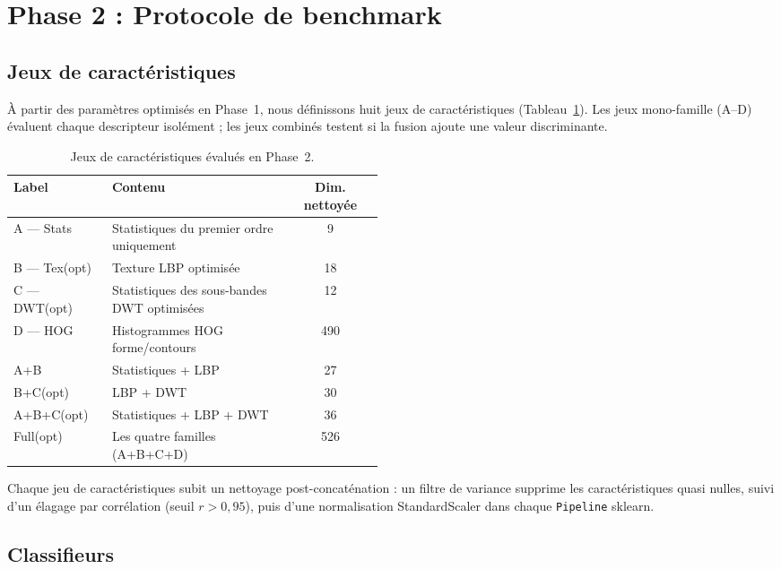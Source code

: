 \section{Phase 2 : Protocole de benchmark}
\label{sec:phase2}

\subsection{Jeux de caractéristiques}

À partir des paramètres optimisés en Phase~1, nous définissons huit jeux de
caractéristiques (Tableau~\ref{tab:feature_sets}). Les jeux mono-famille (A--D)
évaluent chaque descripteur isolément ; les jeux combinés testent si la fusion
ajoute une valeur discriminante.

\begin{table}[H]
  \centering
  \caption{Jeux de caractéristiques évalués en Phase~2.}
  \label{tab:feature_sets}
  \begin{tabular}{@{}lp{0.48\linewidth}c@{}}
    \toprule
    \textbf{Label} & \textbf{Contenu} & \textbf{Dim. nettoyée} \\
    \midrule
    A --- Stats       & Statistiques du premier ordre uniquement   & 9 \\
    B --- Tex(opt)    & Texture LBP optimisée                      & 18 \\
    C --- DWT(opt)    & Statistiques des sous-bandes DWT optimisées & 12 \\
    D --- HOG         & Histogrammes HOG forme/contours            & 490 \\
    A+B               & Statistiques + LBP                         & 27 \\
    B+C(opt)          & LBP + DWT                                  & 30 \\
    A+B+C(opt)        & Statistiques + LBP + DWT                   & 36 \\
    Full(opt)         & Les quatre familles (A+B+C+D)              & 526 \\
    \bottomrule
  \end{tabular}
\end{table}

Chaque jeu de caractéristiques subit un nettoyage post-concaténation : un filtre
de variance supprime les caractéristiques quasi nulles, suivi d'un élagage par
corrélation (seuil $r > 0{,}95$), puis d'une normalisation StandardScaler dans
chaque \texttt{Pipeline} sklearn.

\subsection{Classifieurs}

